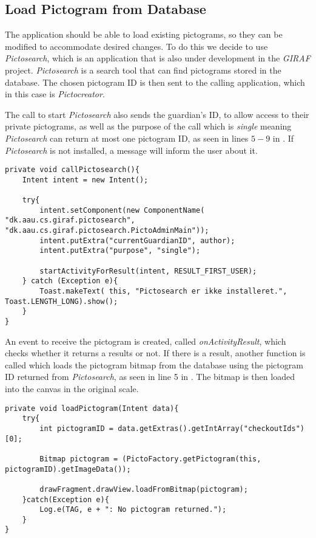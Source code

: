 \subsection{Load Pictogram from Database}
The application should be able to load existing pictograms, so they can be modified to accommodate desired changes.
To do this we decide to use \textit{Pictosearch}, which is an application that is also under development in the \textit{GIRAF} project.
\textit{Pictosearch} is a search tool that can find pictograms stored in the database.
The chosen pictogram ID is then sent to the calling application, which in this case is \textit{Pictocreator}.

The call to start \textit{Pictosearch} also sends the guardian's ID, to allow access to their private pictograms, as well as the purpose of the call which is \textit{single} meaning \textit{Pictosearch} can return at most one pictogram ID, as seen in lines $5-9$ in .
If \textit{Pictosearch} is not installed, a message will inform the user about it.

\begin{lstlisting}[caption=Method used to launch \textit{Pictosearch}., label=lst:callPictosearch]
private void callPictosearch(){
    Intent intent = new Intent();

    try{
        intent.setComponent(new ComponentName( "dk.aau.cs.giraf.pictosearch",  "dk.aau.cs.giraf.pictosearch.PictoAdminMain"));
        intent.putExtra("currentGuardianID", author);
        intent.putExtra("purpose", "single");

        startActivityForResult(intent, RESULT_FIRST_USER);
    } catch (Exception e){
        Toast.makeText( this, "Pictosearch er ikke installeret.", Toast.LENGTH_LONG).show();
    }
}
\end{lstlisting}

An event to receive the pictogram is created, called \textit{onActivityResult}, which checks whether it returns a results or not.
If there is a result, another function is called which loads the pictogram bitmap from the database using the pictogram ID returned from \textit{Pictosearch}, as seen in line 5 in  .
The bitmap is then loaded into the canvas in the original scale.

\begin{lstlisting}[caption=Method to load a pictogram from Id received from \textit{Pictosearch}, label=lst:loadPictogram]
private void loadPictogram(Intent data){
    try{
        int pictogramID = data.getExtras().getIntArray("checkoutIds")[0];

        Bitmap pictogram = (PictoFactory.getPictogram(this, pictogramID).getImageData());

        drawFragment.drawView.loadFromBitmap(pictogram);
    }catch(Exception e){
        Log.e(TAG, e + ": No pictogram returned.");
    }
}
\end{lstlisting}